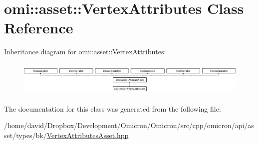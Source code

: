 \hypertarget{classomi_1_1asset_1_1_vertex_attributes}{}\section{omi\+:\+:asset\+:\+:Vertex\+Attributes Class Reference}
\label{classomi_1_1asset_1_1_vertex_attributes}
Inheritance diagram for omi\+:\+:asset\+:\+:Vertex\+Attributes\+:\begin{figure}[H]
\begin{center}
\leavevmode
\includegraphics[height=1.647059cm]{classomi_1_1asset_1_1_vertex_attributes}
\end{center}
\end{figure}


The documentation for this class was generated from the following file\+:\begin{DoxyCompactItemize}
\item 
/home/david/\+Dropbox/\+Development/\+Omicron/\+Omicron/src/cpp/omicron/api/asset/types/bk/\hyperlink{_vertex_attributes_asset_8hpp}{Vertex\+Attributes\+Asset.\+hpp}\end{DoxyCompactItemize}
